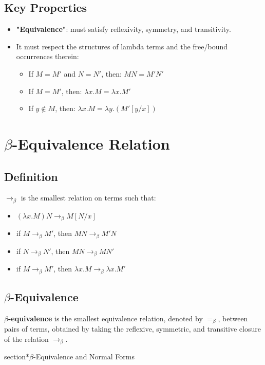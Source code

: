 \documentclass{article}
\begin{document}
\subsection*{Key Properties}
\begin{itemize}
    \item \textbf{"Equivalence"}: must satisfy reflexivity, symmetry, and transitivity.
    \item It must respect the structures of lambda terms and the free/bound occurrences therein:

    \begin{itemize}
        \item If $M = M'$ and $N = N'$, then: $MN = M'N'$
        \item If $M = M'$, then: $\lambda x.M = \lambda x.M'$
        \item If $y \notin M$, then: $\lambda x.M = \lambda y.(M'[y/x])$
    \end{itemize}
\end{itemize}

\section*{$\beta$-Equivalence Relation}

\subsection*{Definition}
$\to_\beta$ is the smallest relation on terms such that:
\begin{itemize}
    \item $(\lambda x.M)N \to_\beta M[N/x]$
    \item if $M \to_\beta M'$, then $MN \to_\beta M'N$
    \item if $N \to_\beta N'$, then $MN \to_\beta MN'$
    \item if $M \to_\beta M'$, then $\lambda x.M \to_\beta \lambda x.M'$
\end{itemize}

\subsection*{$\beta$-Equivalence}
\textbf{$\beta$-equivalence} is the smallest equivalence relation, denoted by $=_\beta$, between pairs of terms, obtained by taking the reflexive, symmetric, and transitive closure of the relation $\to_\beta$.

section*{$\beta$-Equivalence and Normal Forms}
\end{document}
